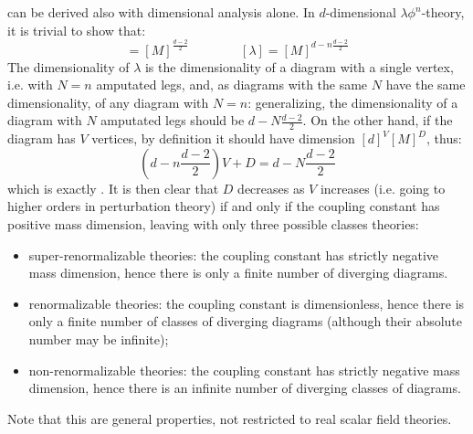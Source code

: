  can be derived also with dimensional analysis alone. In $ d $-dimensional $ \lambda \phi^n $-theory, it is trivial to show that:
\begin{equation*}
  [\phi] = [M]^{\frac{d - 2}{2}}
  \qquad \qquad
  [\lambda] = [M]^{d - n \frac{d - 2}{2}}
\end{equation*}
The dimensionality of $ \lambda $ is the dimensionality of a diagram with a single vertex, i.e. with $ N = n $ amputated legs, and, as diagrams with the same $ N $ have the same dimensionality, of any diagram with $ N = n $: generalizing, the dimensionality of a diagram with $ N $ amputated legs should be $ d - N \frac{d - 2}{2} $. On the other hand, if the diagram has $ V $ vertices, by definition it should have dimension $ [d]^V [M]^D $, thus:
\begin{equation*}
  \left( d - n \frac{d - 2}{2} \right) V + D = d - N \frac{d - 2}{2}
\end{equation*}
which is exactly . It is then clear that $ D $ decreases as $ V $ increases (i.e. going to higher orders in perturbation theory) if and only if the coupling constant has positive mass dimension, leaving with only three possible classes theories:
\begin{itemize}
  \item super-renormalizable theories: the coupling constant has strictly negative mass dimension, hence there is only a finite number of diverging diagrams.
  \item renormalizable theories: the coupling constant is dimensionless, hence there is only a finite number of classes of diverging diagrams (although their absolute number may be infinite);
  \item non-renormalizable theories: the coupling constant has strictly negative mass dimension, hence there is an infinite number of diverging classes of diagrams.
\end{itemize}
Note that this are general properties, not restricted to real scalar field theories.

